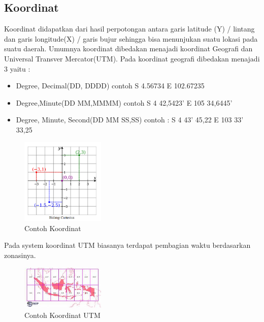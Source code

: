 \subsection{Koordinat}
Koordinat didapatkan dari hasil perpotongan antara garis latitude (Y) / lintang dan garis longitude(X) / garis bujur sehingga bisa menunjukan suatu lokasi pada suatu daerah. \hfill\break 
Umumnya koordinat dibedakan menajadi koordinat Geografi dan Universal Transver Mercator(UTM). Pada koordinat geografi dibedakan menajadi 3 yaitu : \hfill\break
\begin{itemize}
	\item Degree, Decimal(DD, DDDD) contoh S 4.56734 E 102.67235
	\item Degree,Minute(DD MM,MMMM) contoh S 4 42,5423’ E 105 34,6445’
	\item Degree, Minute, Second(DD MM SS,SS) contoh : S 4 43’ 45,22 E 103 33’ 33,25
\end{itemize}
\hfill\break
\begin{figure}[H]
	\includegraphics[width=4cm]{figures/1174025/1.png}
	\centering
	\caption{Contoh Koordinat}
\end{figure}
Pada system koordinat UTM biasanya terdapat pembagian waktu berdasarkan zonasinya. \hfill\break
\begin{figure}[H]
	\includegraphics[width=4cm]{figures/1174025/2.jpg}
	\centering
	\caption{Contoh Koordinat UTM}
\end{figure}

